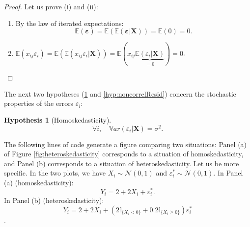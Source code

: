 \documentclass[
  12pt,
]{book}
\providecommand{\tightlist}{%
  \setlength{\itemsep}{0pt}\setlength{\parskip}{0pt}}
\theoremstyle{definition}
\theoremstyle{definition}
\theoremstyle{definition}
\theoremstyle{definition}
\newtheorem{hypothesis}{Hypothesis}[chapter]
\theoremstyle{remark}
\begin{document}
\begin{proof}

Let us prove (i) and (ii):

\begin{enumerate}
\def\labelenumi{\roman{enumi}.}
\tightlist
\item
  By the law of iterated expectations:
  \[
  \mathbb{E}(\boldsymbol\varepsilon)=\mathbb{E}(\mathbb{E}(\boldsymbol\varepsilon|\mathbf{X}))=\mathbb{E}(0)=0.
  \]
\item
  \(\mathbb{E}(x_{ij}\varepsilon_i)=\mathbb{E}(\mathbb{E}(x_{ij}\varepsilon_i|\mathbf{X}))=\mathbb{E}(x_{ij}\underbrace{\mathbb{E}(\varepsilon_i|\mathbf{X})}_{=0})=0\).
\end{enumerate}

\end{proof}

The next two hypotheses (\ref{hyp:homoskedasticity} and \ref{hyp:noncorrelResid}) concern the stochastic properties of the errors \(\varepsilon_i\):

\begin{hypothesis}[Homoskedasticity]
\protect\hypertarget{hyp:homoskedasticity}{}\label{hyp:homoskedasticity}\[
\forall i, \quad \mathbb{V}ar(\varepsilon_i|\mathbf{X}) = \sigma^2.
\]
\end{hypothesis}

The following lines of code generate a figure comparing two situations: Panel (a) of Figure \ref{fig:heteroskedasticity} corresponds to a situation of homoskedasticity, and Panel (b) corresponds to a situation of heteroskedasticity. Let us be more specific. In the two plots, we have \(X_i \sim \mathcal{N}(0,1)\) and \(\varepsilon^*_i \sim \mathcal{N}(0,1)\). In Panel (a) (homoskedasticity):
\[
Y_i = 2 + 2X_i + \varepsilon^*_i.
\]
In Panel (b) (heteroskedasticity):
\[
Y_i = 2 + 2X_i + \left(2\mathbb{I}_{\{X_i<0\}}+0.2\mathbb{I}_{\{X_i\ge0\}}\right)\varepsilon^*_i\].
\end{document}

